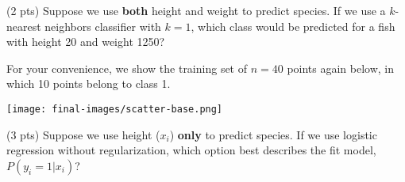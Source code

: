 \documentclass[twoside,12pt]{article}
\begin{document}
\begin{probset}
\begin{prob}[(20 pts)]
\begin{subprobset}
\begin{subprob}







\end{subprob}

\vspace{0.2in}

\begin{subprob}(2 pts) Suppose we use \textbf{both} height and weight to predict species. If we use a $k$-nearest neighbors classifier with $k=1$, which class would be predicted for a fish with height 20 and weight 1250?


    
\end{subprob}

\end{subprobset}

\newpage

For your convenience, we show the training set of $n=40$ points again below, in which 10 points belong to class 1.

\begin{center}
\texttt{[image: final-images/scatter-base.png]}
\end{center}

\begin{subprobset}

\begin{subprob}(3 pts) Suppose we use height ($x_i$) \textbf{only} to predict species. If we use logistic regression without regularization, which option best describes the fit model, $P(y_i = 1 | x_i)$?








\end{subprob}
\end{subprobset}
\end{prob}
\end{probset}
\end{document}
